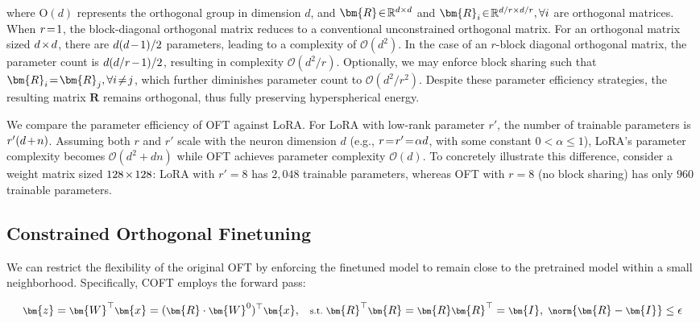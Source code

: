 where $\text{O}(d)$ represents the orthogonal group in dimension $d$, and $\thickmuskip=2mu \medmuskip=2mu \bm{R}\in\mathbb{R}^{d\times d}$ and $\thickmuskip=2mu \medmuskip=2mu \bm{R}_i\in\mathbb{R}^{d/r\times d/r},\forall i$ are orthogonal matrices. When $\thickmuskip=2mu \medmuskip=2mu r=1$, the block-diagonal orthogonal matrix reduces to a conventional unconstrained orthogonal matrix. For an orthogonal matrix sized $\thickmuskip=2mu \medmuskip=2mu d\times d$, there are $\thickmuskip=2mu \medmuskip=2mu d(d-1)/2$ parameters, leading to a complexity of $\mathcal{O}(d^2)$. In the case of an $r$-block diagonal orthogonal matrix, the parameter count is $\thickmuskip=2mu \medmuskip=2mu d(d/r-1)/2$, resulting in complexity $\mathcal{O}(d^2/r)$. Optionally, we may enforce block sharing such that $\thickmuskip=2mu \medmuskip=2mu \bm{R}_i=\bm{R}_j,\forall i\neq j$, which further diminishes parameter count to $\mathcal{O}(d^2/r^2)$. Despite these parameter efficiency strategies, the resulting matrix $\bm{R}$ remains orthogonal, thus fully preserving hyperspherical energy.

We compare the parameter efficiency of OFT against LoRA. For LoRA with low-rank parameter $r'$, the number of trainable parameters is $\thickmuskip=2mu \medmuskip=2mu r'(d+n)$. Assuming both $r$ and $r'$ scale with the neuron dimension $d$ (e.g., $\thickmuskip=2mu \medmuskip=2mu r=r'=\alpha d$, with some constant $0<\alpha\leq 1$), LoRA's parameter complexity becomes $\mathcal{O}(d^2+dn)$ while OFT achieves parameter complexity $\mathcal{O}(d)$. To concretely illustrate this difference, consider a weight matrix sized $\thickmuskip=2mu \medmuskip=2mu 128\times 128$: LoRA with $r'=8$ has $2,048$ trainable parameters, whereas OFT with $r=8$ (no block sharing) has only $960$ trainable parameters.

\subsection{Constrained Orthogonal Finetuning}

We can restrict the flexibility of the original OFT by enforcing the finetuned model to remain close to the pretrained model within a small neighborhood. Specifically, COFT employs the forward pass:

\begin{equation}\label{eq:coft_general}
    \footnotesize
    \bm{z}=\bm{W}^\top\bm{x}=(\bm{R}\cdot\bm{W}^0)^\top\bm{x},~~~\text{s.t.}~\bm{R}^\top\bm{R}=\bm{R}\bm{R}^\top=\bm{I},~\norm{\bm{R}-\bm{I}}\leq \epsilon
\end{equation}

